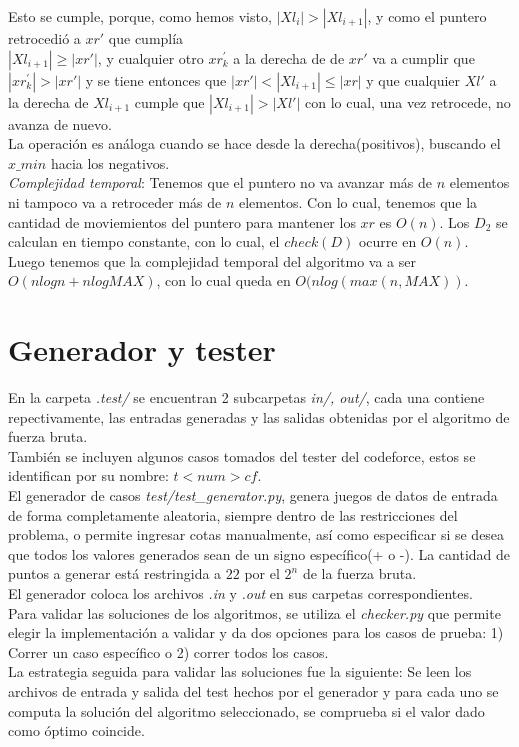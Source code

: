 \documentclass{article}
\begin{document}
 Esto se cumple, porque, como hemos visto, $|Xl_i|>|Xl_{i+1}|$, y como el puntero retrocedi\'o a $xr'$ que cumpl\'ia\\ $|Xl_{i+1}|\geq|xr'|$, y cualquier otro $xr^{'}_{k}$ a la derecha de de $xr'$ va a cumplir que $|xr^{'}_{k}|>|xr'|$ y se tiene entonces que $|xr'|<|Xl_{i+1}|\leq |xr|$ y que cualquier $Xl'$ a la derecha de $Xl_{i+1}$ cumple que $|Xl_{i+1}|>|Xl'|$ con lo cual, una vez retrocede, no avanza de nuevo.\\
 
 La operaci\'on es an\'aloga cuando se hace desde la derecha(positivos), buscando el $x\_min$ hacia los negativos.\\
 
 \textit{Complejidad temporal}: Tenemos que el puntero no va avanzar m\'as de $n$ elementos ni tampoco va a retroceder m\'as de $n$ elementos. Con lo cual, tenemos que la cantidad de moviemientos del puntero para mantener los $xr$ es $O(n)$. Los $D_2$ se calculan en tiempo constante, con lo cual, el $check(D)$ ocurre en $O(n)$.\\
 
 Luego tenemos que la complejidad temporal del algoritmo va a ser $O(nlogn+nlogMAX)$, con lo cual queda en $O(nlog(max(n,MAX))$.
 
 
\section{Generador y tester}

En la carpeta \textit{.test/} se encuentran 2 subcarpetas \textit{in/, out/}, cada una contiene repectivamente, las entradas generadas y las salidas obtenidas por el algoritmo de fuerza bruta.\\
Tambi\'en se incluyen algunos casos tomados del tester del codeforce, estos se identifican por su nombre: \textit{$t<num>cf$}.\\

El generador de casos \textit{test/test\_generator.py}, genera juegos de datos de entrada de forma completamente aleatoria, siempre dentro de las restricciones del problema, o permite ingresar cotas manualmente, as\'i como especificar si se desea que todos los valores generados sean de un signo espec\'ifico(+ o -). La cantidad de puntos a generar est\'a restringida a $22$ por el $2^n$ de la fuerza bruta.\\

El generador coloca los archivos \textit{.in} y \textit{.out} en sus carpetas correspondientes.\\

Para validar las soluciones de los algoritmos, se utiliza el \textit{checker.py} que permite elegir la implementaci\'on a validar y da dos opciones para los casos de prueba: 1) Correr un caso espec\'ifico o 2) correr todos los casos.\\

La estrategia seguida para validar las soluciones fue la siguiente: Se leen los archivos de entrada y salida del test hechos por el generador y para cada uno se computa la soluci\'on del algoritmo seleccionado, se comprueba si el valor dado como \'optimo coincide.\\
\end{document}
